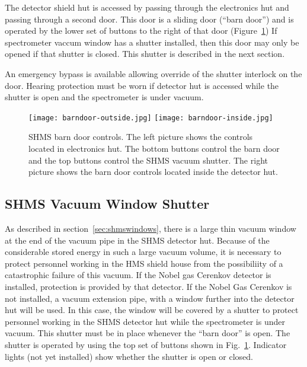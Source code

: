 The detector shield hut is accessed by passing through the electronics
hut and passing through a second door.  This door is a sliding door
(``barn door'') and is operated by the lower set of buttons to the
right of that door (Figure~\ref{fig:barndoorcontrol})  If spectrometer
vaccum window has a shutter installed, then this door may only be
opened if that shutter is closed.  This shutter is described in the
next section.

An emergency bypass is available allowing override of the shutter
interlock on the door.  Hearing protection must be worn if detector
hut is accessed while the shutter is open and the spectrometer is
under vacuum.

\begin{figure}
\begin{center}
\texttt{[image: barndoor-outside.jpg]}
\texttt{[image: barndoor-inside.jpg]}
\caption{\label{fig:barndoorcontrol}SHMS barn door controls.  The left
  picture shows the controls located in electronics hut.  The bottom
  buttons control the barn door and the top buttons control the SHMS
  vacuum shutter.  The right picture shows the barn door controls
  located inside the detector hut.}
\end{center}
\end{figure}

\subsection{SHMS Vacuum Window Shutter}
\label{sec:shmsshutter}
As described in section~\ref{sec:shmswindows}, there is a large thin
vacuum window at the end of the vacuum pipe in the SHMS detector hut.
Because of
the considerable stored energy in such a large vacuum volume, it is
necessary to protect personnel working in the HMS shield house from
the possibiliity of a catastrophic failure of this vacuum. 
If
the Nobel gas Cerenkov detector is installed, protection is provided
by that detector.
If the Nobel Gas Cerenkov is not installed, a vacuum
extension pipe, with a window further into the detector hut will be
used.  In this case, the window will be covered by a shutter to
protect personnel working in the SHMS detector hut while the
spectrometer is under vacuum.  This shutter must be in place whenever
the ``barn door'' is open.  The shutter is operated by using the top
set of buttons shown in Fig.~\ref{fig:barndoorcontrol}.  Indicator
lights (not yet installed) show whether the shutter is open or closed.


